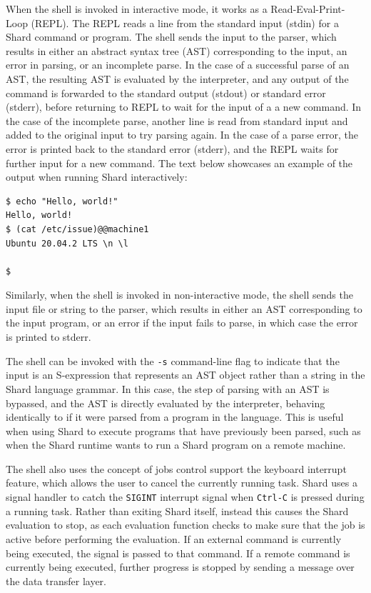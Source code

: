 \documentclass[oneside]{report}
\begin{document}
When the shell is invoked in interactive mode, it works as a Read-Eval-Print-Loop (REPL). The REPL reads a line from the standard input (stdin) for a Shard command or program. The shell sends the input to the parser, which results in either an abstract syntax tree (AST) corresponding to the input, an error in parsing, or an incomplete parse.
In the case of a successful parse of an AST, the resulting AST is evaluated by the interpreter, and any output of the command is forwarded to the standard output (stdout) or standard error (stderr), before returning to REPL to wait for the input of a a new command.
In the case of the incomplete parse, another line is read from standard input and added to the original input to try parsing again.
In the case of a parse error, the error is printed back to the standard error (stderr), and the REPL waits for further input for a new command.
The text below showcases an example of the output when running Shard interactively:

\begin{minipage}[c]{\textwidth-15pt}
  \begin{lstlisting}[language=Shard]
$ echo "Hello, world!"
Hello, world!
$ (cat /etc/issue)@@machine1
Ubuntu 20.04.2 LTS \n \l

$
\end{lstlisting}
  \smallskip
\end{minipage}

Similarly, when the shell is invoked in non-interactive mode, the shell sends the input file or string to the parser, which results in either an AST corresponding to the input program, or an error if the input fails to parse, in which case the error is printed to stderr.

The shell can be invoked with the \texttt{-s} command-line flag to indicate that the input is an S-expression that represents an AST object rather than a string in the Shard language grammar. In this case, the step of parsing with an AST is bypassed, and the AST is directly evaluated by the interpreter, behaving identically to if it were parsed from a program in the language.
This is useful when using Shard to execute programs that have previously been parsed, such as when the Shard runtime wants to run a Shard program on a remote machine.

The shell also uses the concept of jobs control support the keyboard interrupt feature, which allows the user to cancel the currently running task.
Shard uses a signal handler to catch the \texttt{SIGINT} interrupt signal when \texttt{Ctrl-C} is pressed during a running task.
Rather than exiting Shard itself, instead this causes the Shard evaluation to stop, as each evaluation function checks to make sure that the job is active before performing the evaluation.
If an external command is currently being executed, the signal is passed to that command. If a remote command is currently being executed, further progress is stopped by sending a message over the data transfer layer.
\end{document}
